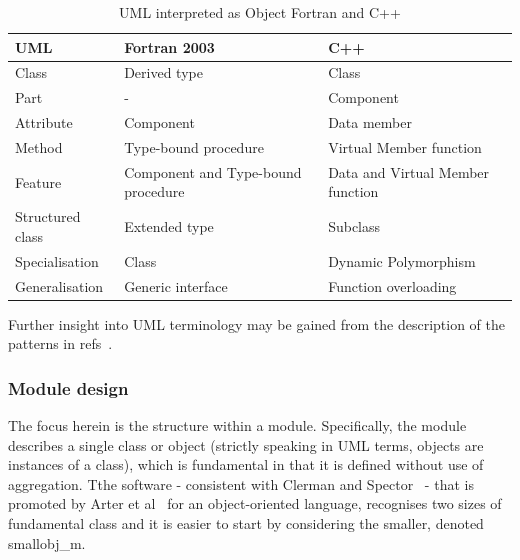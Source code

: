 \begin{table}[tbph]
\begin{center}
\caption{UML interpreted as Object Fortran and C++ \label{tab:TS_umltrans}}
\begin{tabular}{|p{5cm}|p{5cm}|p{5cm}|}
\hline
UML & Fortran 2003 & C++  \\
\hline
Class & Derived type & Class \\
Part  &  - & Component  \\
Attribute & Component & Data member \\
Method & Type-bound procedure & Virtual Member function \\
Feature  & Component and Type-bound procedure & Data and Virtual Member function \\
Structured class & Extended type & Subclass  \\
Specialisation & Class & Dynamic Polymorphism \\
Generalisation & Generic interface & Function overloading \\
\hline
\end{tabular}
Further insight into UML terminology may be gained from the description
of the patterns in refs~\cite{y2re332,y2re333}.
\end{center}
\end{table}


\subsubsection{Module design}

The focus herein is the structure within a module. Specifically, the module describes a single class or object
(strictly speaking in UML terms, objects are instances of a class), which is
fundamental in that it is defined without use of aggregation.
Tthe software  - consistent with Clerman and Spector~\cite[\S\,11]{clermanspector} -
that is promoted by Arter et al~\cite{fprog} for an object-oriented language, recognises two sizes of fundamental class
and it is easier to start by considering the smaller, denoted smallobj\_m.

